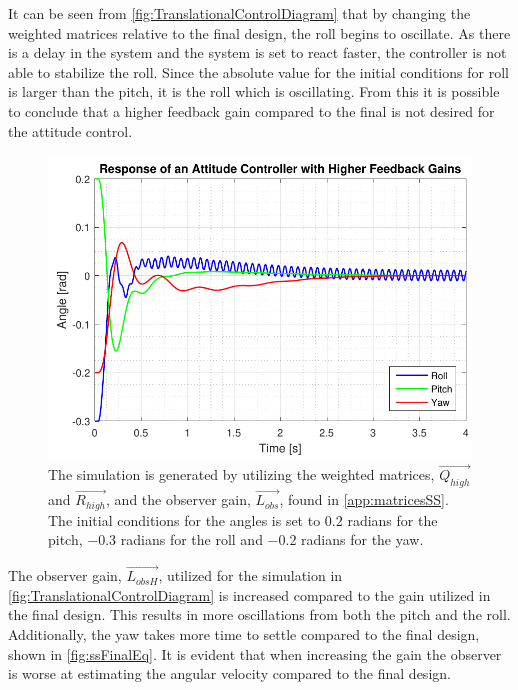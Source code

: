It can be seen from \autoref{fig:TranslationalControlDiagram} that by changing the weighted matrices relative to the final design, the roll begins to oscillate. As there is a delay in the system and the system is set to react faster, the controller is not able to stabilize the roll. Since the absolute value for the initial conditions for roll is larger than the pitch, it is the roll which is oscillating. From this it is possible to conclude that a higher feedback gain compared to the final is not desired for the attitude control.

\begin{figure}[H]
	\centering
	\includegraphics[scale=1]{figures/ssEqBad.pdf}
	\caption{The simulation is generated by utilizing the weighted matrices, $\vec{Q_{high}}$ and $\vec{R_{high}}$, and the observer gain, $\vec{L_{obs}}$, found in \autoref{app:matricesSS}. The initial conditions for the angles is set to $0.2$ radians for the pitch, $-0.3$ radians for the roll and $-0.2$ radians for the yaw.}
	\label{fig:TranslationalControlDiagram}
\end{figure}

The observer gain, $\vec{L_{obsH}}$, utilized for the simulation in  \autoref{fig:TranslationalControlDiagram} is increased compared to the gain utilized in the final design. This results in more oscillations from both the pitch and the roll. Additionally, the yaw takes more time to settle compared to the final design, shown in \autoref{fig:ssFinalEq}. It is evident that when increasing the gain the observer is worse at estimating the angular velocity compared to the final design.

